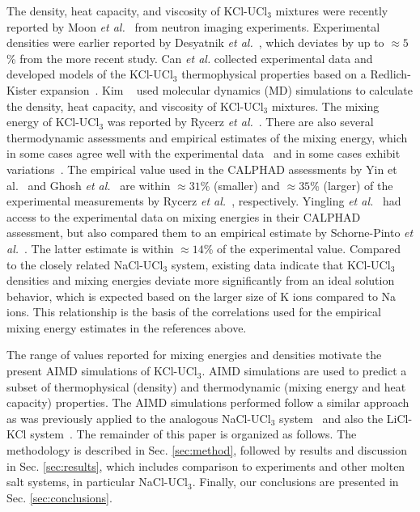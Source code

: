 \documentclass[preprint,3p,10pt,number,sort&compress]{elsarticle}
\begin{document}
The density, heat capacity, and viscosity of KCl-UCl$_3$ mixtures were recently reported by Moon \textit{et al.}~\cite{Moon} from neutron imaging experiments. Experimental densities were earlier reported by Desyatnik \textit{et al.}~\cite{DesyatnikKCl}, which deviates by up to $\approx 5$\% from the more recent study. Can \textit{et al.} collected experimental data and developed models of the KCl-UCl$_3$ thermophysical properties based on a Redlich-Kister expansion~\cite{agca2022}. Kim ~\cite{Kim} used molecular dynamics (MD) simulations to calculate the density, heat capacity, and viscosity of KCl-UCl$_3$ mixtures. The mixing energy of KCl-UCl$_3$ was reported by Rycerz \textit{et al.}~\cite{Rycerz}. There are also several thermodynamic assessments and empirical estimates of the mixing energy, which in some cases agree well with the experimental data~\cite{Rycerz,Yingling} and in some cases exhibit variations~\cite{YIN2020,Ghosh}. The empirical value used in the CALPHAD assessments by Yin et al.~\cite{YIN2020} and Ghosh \textit{et al.}~\cite{Ghosh} are within $\approx 31$\% (smaller) and $\approx 35$\% (larger) of the experimental measurements by Rycerz \textit{et al.}~\cite{Rycerz}, respectively. Yingling \textit{et al.}~\cite{Yingling} had access to the experimental data on mixing energies in their CALPHAD assessment, but also compared them to an empirical estimate by Schorne-Pinto \textit{et al.}~\cite{Pinto}. The latter estimate is within $\approx 14$\% of the experimental value. Compared to the closely related NaCl-UCl$_3$ system, existing data indicate that KCl-UCl$_3$ densities and mixing energies deviate more significantly from an ideal solution behavior, which is expected based on the larger size of K ions compared to Na ions. This relationship is the basis of the correlations used for the empirical mixing energy estimates in the references above. 

The range of values reported for mixing energies and densities motivate the present AIMD simulations of KCl-UCl$_3$. AIMD simulations are used to predict a subset of thermophysical (density) and thermodynamic (mixing energy and heat capacity) properties. The AIMD simulations performed follow a similar approach as was previously applied to the analogous NaCl-UCl$_3$ system~\cite{Andersson} and also the LiCl-KCl system~\cite{DUEMMLER2022153414}. The remainder of this paper is organized as follows. The methodology is described in Sec. \ref{sec:method}, followed by results and discussion in Sec. \ref{sec:results}, which includes comparison to experiments and other molten salt systems, in particular NaCl-UCl$_3$. Finally, our conclusions are presented in Sec. \ref{sec:conclusions}. 
\end{document}
